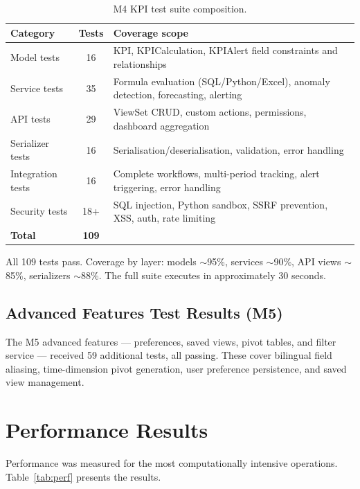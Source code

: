 \begin{table}[h!]
\centering
\caption{M4 KPI test suite composition.}
\label{tab:m4tests}
\renewcommand{\arraystretch}{1.3}
\begin{tabular}{|l|c|l|}
\hline
\textbf{Category} & \textbf{Tests} & \textbf{Coverage scope} \\
\hline
Model tests        & 16  & KPI, KPICalculation, KPIAlert field constraints and relationships \\
Service tests      & 35  & Formula evaluation (SQL/Python/Excel), anomaly detection, forecasting, alerting \\
API tests          & 29  & ViewSet CRUD, custom actions, permissions, dashboard aggregation \\
Serializer tests   & 16  & Serialisation/deserialisation, validation, error handling \\
Integration tests  & 16  & Complete workflows, multi-period tracking, alert triggering, error handling \\
Security tests     & 18+ & SQL injection, Python sandbox, SSRF prevention, XSS, auth, rate limiting \\
\hline
\textbf{Total}     & \textbf{109} & \\
\hline
\end{tabular}
\end{table}

\noindent
All 109 tests pass.
Coverage by layer: models $\sim$95\%,
services $\sim$90\%,
API views $\sim$85\%,
serializers $\sim$88\%.
The full suite executes in approximately 30 seconds.

\subsection{Advanced Features Test Results (M5)}

\noindent
The M5 advanced features — preferences,
saved views, pivot tables, and filter service —
received 59 additional tests,
all passing.
These cover bilingual field aliasing,
time-dimension pivot generation,
user preference persistence,
and saved view management.


\section{Performance Results}

\noindent
Performance was measured
for the most computationally intensive operations.
Table~\ref{tab:perf} presents the results.

